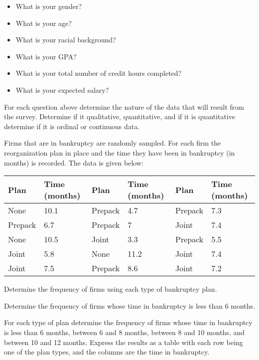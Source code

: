 \begin{problem}
  \begin{itemize}
  \item What is your gender? 
  \item What is your age?
  \item What is your racial background?
  \item What is your GPA?
  \item What is your total number of credit hours completed?
  \item What is your expected salary?
  \end{itemize}

  For each question above determine the nature of the data that will
  result from the survey. Determine if it qualitative, quantitative,
  and if it is quantitative determine if it is ordinal or continuous
  data.

  \vfill

  \clearpage

\item Firms that are in bankruptcy are randomly sampled. For each firm
  the reorganization plan in place and the time they have been in
  bankruptcy (in months) is recorded. The data is given below:

  \begin{tabular}{ll|ll|ll} %
    Plan & Time  (months) & 
    Plan & Time  (months) & 
    Plan & Time  (months)\\ \hline
    None    & 10.1 & Prepack & 4.7  & Prepack & 7.3 \\
    Prepack & 6.7  & Prepack & 7    & Joint   & 7.4 \\
    None    & 10.5 & Joint   & 3.3  & Prepack & 5.5 \\
    Joint   & 5.8  & None    & 11.2 & Joint   & 7.4 \\
    Joint   & 7.5  & Prepack & 8.6  & Joint   & 7.2 
  \end{tabular}

  \begin{subproblem}
  \item Determine the frequency of firms using each type of bankruptcy
    plan.
    \vfill
  \item Determine the frequency of firms whose time in bankruptcy is less
    than 6 months. 
    \vfill
  \item For each type of plan determine the frequency of firms whose
    time in bankruptcy is less than 6 months, between 6 and 8 months,
    between 8 and 10 months, and between 10 and 12 months. Express the
    results as a table with each row being one of the plan types, and
    the columns are the time in bankruptcy.
    \vfill
  \end{subproblem}



\end{problem}
